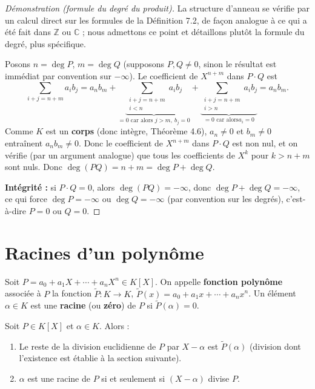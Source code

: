 \documentclass[a4paper,12pt,openany]{book}
\begin{document}
\begin{proof}[Démonstration (formule du degré du produit)]
La structure d'anneau se vérifie par un calcul direct sur les formules de
la Définition 7.2, de façon analogue à ce qui a été fait dans
$\mathbb{Z}$ ou $\mathbb{C}$ ; nous admettons ce point et détaillons
plutôt la formule du degré, plus spécifique.

Posons $n=\deg P$, $m=\deg Q$ (supposons $P,Q\neq0$, sinon le résultat est
immédiat par convention sur $-\infty$). Le coefficient de $X^{n+m}$ dans
$P\cdot Q$ est
\[
\sum_{i+j=n+m} a_ib_j = a_nb_m + \underbrace{\sum_{\substack{i+j=n+m \\
i<n}} a_ib_j}_{=0 \text{ car alors } j>m,\ b_j=0} +
\underbrace{\sum_{\substack{i+j=n+m \\ i>n}} a_ib_j}_{=0 \text{ car alors
} a_i=0}
= a_nb_m.
\]
Comme $K$ est un \textbf{corps} (donc intègre, Théorème 4.6), $a_n\neq0$
et $b_m\neq0$ entraînent $a_nb_m\neq0$. Donc le coefficient de $X^{n+m}$
dans $P\cdot Q$ est non nul, et on vérifie (par un argument analogue) que
tous les coefficients de $X^k$ pour $k>n+m$ sont nuls. Donc
$\deg(PQ)=n+m=\deg P+\deg Q$.

\textbf{Intégrité :} si $P\cdot Q=0$, alors $\deg(PQ)=-\infty$, donc
$\deg P+\deg Q=-\infty$, ce qui force $\deg P=-\infty$ ou $\deg
Q=-\infty$ (par convention sur les degrés), c'est-à-dire $P=0$ ou $Q=0$.
\end{proof}


\section{Racines d'un polynôme}

\begin{definition}[7.3]
Soit $P=a_0+a_1X+\cdots+a_nX^n \in K[X]$. On appelle \textbf{fonction
polynôme} associée à $P$ la fonction $\widetilde P : K\to K$,
$\widetilde P(x) = a_0+a_1x+\cdots+a_nx^n$. Un élément $\alpha\in K$ est
une \textbf{racine} (ou \textbf{zéro}) de $P$ si $\widetilde P(\alpha)=0$.
\end{definition}

\begin{theoreme}[7.2]
Soit $P\in K[X]$ et $\alpha\in K$. Alors :
\begin{enumerate}
  \item Le reste de la division euclidienne de $P$ par $X-\alpha$ est
  $\widetilde P(\alpha)$ (division dont l'existence est établie à la
  section suivante).
  \item $\alpha$ est une racine de $P$ si et seulement si $(X-\alpha)$
  divise $P$.
\end{enumerate}
\end{theoreme}
\end{document}
